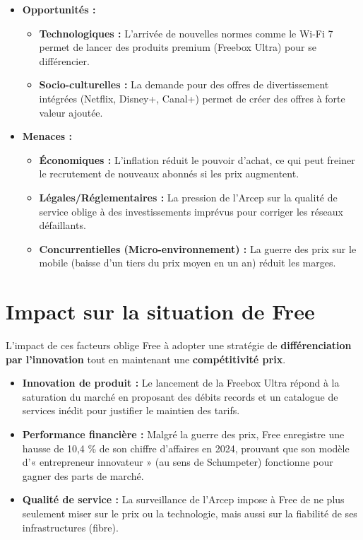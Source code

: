\documentclass{article}
\begin{document}
\begin{itemize}
    \item \textbf{Opportunités :}
    \begin{itemize}
        \item \textbf{Technologiques :} L'arrivée de nouvelles normes comme le Wi-Fi 7 permet de lancer des produits premium (Freebox Ultra) pour se différencier.
        \item \textbf{Socio-culturelles :} La demande pour des offres de divertissement intégrées (Netflix, Disney+, Canal+) permet de créer des offres à forte valeur ajoutée.
    \end{itemize}
    \item \textbf{Menaces :}
    \begin{itemize}
        \item \textbf{Économiques :} L'inflation réduit le pouvoir d'achat, ce qui peut freiner le recrutement de nouveaux abonnés si les prix augmentent.
        \item \textbf{Légales/Réglementaires :} La pression de l'Arcep sur la qualité de service oblige à des investissements imprévus pour corriger les réseaux défaillants.
        \item \textbf{Concurrentielles (Micro-environnement) :} La guerre des prix sur le mobile (baisse d'un tiers du prix moyen en un an) réduit les marges.
    \end{itemize}
\end{itemize}

\section{Impact sur la situation de Free}

L'impact de ces facteurs oblige Free à adopter une stratégie de \textbf{différenciation par l'innovation} tout en maintenant une \textbf{compétitivité prix}. 

\begin{itemize}
    \item \textbf{Innovation de produit :} Le lancement de la Freebox Ultra répond à la saturation du marché en proposant des débits records et un catalogue de services inédit pour justifier le maintien des tarifs.
    \item \textbf{Performance financière :} Malgré la guerre des prix, Free enregistre une hausse de 10,4 \% de son chiffre d'affaires en 2024, prouvant que son modèle d'« entrepreneur innovateur » (au sens de Schumpeter) fonctionne pour gagner des parts de marché.
    \item \textbf{Qualité de service :} La surveillance de l'Arcep impose à Free de ne plus seulement miser sur le prix ou la technologie, mais aussi sur la fiabilité de ses infrastructures (fibre).
\end{itemize}
\end{document}
